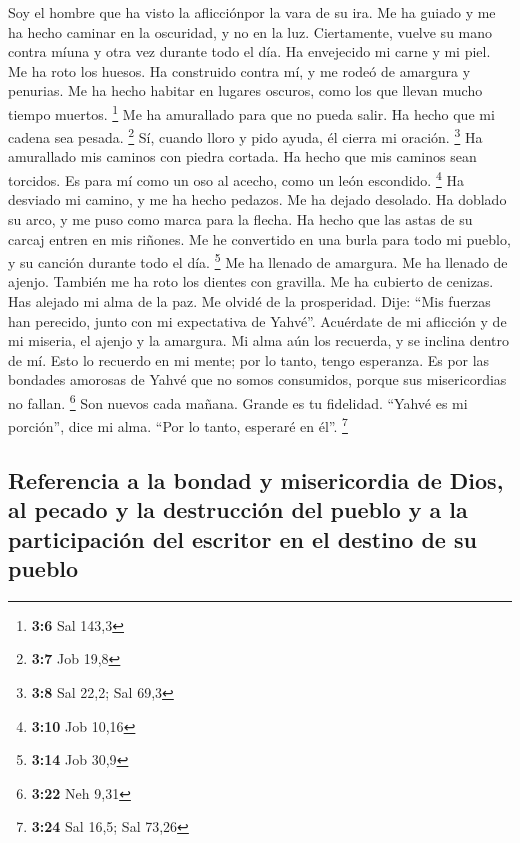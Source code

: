  Soy el hombre que ha visto la aflicciónpor la vara de su
ira.  Me ha guiado y me ha hecho caminar en la oscuridad,
y no en la luz.  Ciertamente, vuelve su mano contra míuna
y otra vez durante todo el día.  Ha envejecido mi carne y
mi piel. Me ha roto los huesos.  Ha construido contra mí,
y me rodeó de amargura y penurias.  Me ha hecho habitar en
lugares oscuros, como los que llevan mucho tiempo muertos. \footnote{\textbf{3:6}
  Sal 143,3}  Me ha amurallado para que no pueda salir. Ha
hecho que mi cadena sea pesada. \footnote{\textbf{3:7} Job 19,8}
 Sí, cuando lloro y pido ayuda, él cierra mi oración.
\footnote{\textbf{3:8} Sal 22,2; Sal 69,3}  Ha amurallado
mis caminos con piedra cortada. Ha hecho que mis caminos sean torcidos.
 Es para mí como un oso al acecho, como un león
escondido. \footnote{\textbf{3:10} Job 10,16}  Ha
desviado mi camino, y me ha hecho pedazos. Me ha dejado desolado.
 Ha doblado su arco, y me puso como marca para la flecha.
 Ha hecho que las astas de su carcaj entren en mis
riñones.  Me he convertido en una burla para todo mi
pueblo, y su canción durante todo el día. \footnote{\textbf{3:14} Job
  30,9}  Me ha llenado de amargura. Me ha llenado de
ajenjo.  También me ha roto los dientes con gravilla. Me
ha cubierto de cenizas.  Has alejado mi alma de la paz.
Me olvidé de la prosperidad.  Dije: ``Mis fuerzas han
perecido, junto con mi expectativa de Yahvé''.  Acuérdate
de mi aflicción y de mi miseria, el ajenjo y la amargura.
 Mi alma aún los recuerda, y se inclina dentro de mí.
 Esto lo recuerdo en mi mente; por lo tanto, tengo
esperanza.  Es por las bondades amorosas de Yahvé que no
somos consumidos, porque sus misericordias no fallan. \footnote{\textbf{3:22}
  Neh 9,31}  Son nuevos cada mañana. Grande es tu
fidelidad.  ``Yahvé es mi porción'', dice mi alma. ``Por
lo tanto, esperaré en él''. \footnote{\textbf{3:24} Sal 16,5; Sal 73,26}

\hypertarget{referencia-a-la-bondad-y-misericordia-de-dios-al-pecado-y-la-destrucciuxf3n-del-pueblo-y-a-la-participaciuxf3n-del-escritor-en-el-destino-de-su-pueblo}{%
\subsection{Referencia a la bondad y misericordia de Dios, al pecado y
la destrucción del pueblo y a la participación del escritor en el
destino de su
pueblo}\label{referencia-a-la-bondad-y-misericordia-de-dios-al-pecado-y-la-destrucciuxf3n-del-pueblo-y-a-la-participaciuxf3n-del-escritor-en-el-destino-de-su-pueblo}}

